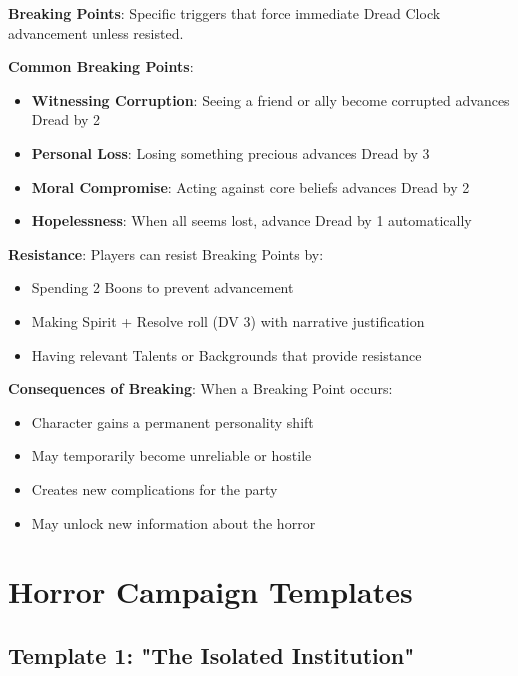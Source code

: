 \documentclass[11pt]{article}
\begin{document}
\begin{mdframed}[backgroundcolor=sanitybg]
\textbf{Breaking Points}: Specific triggers that force immediate Dread Clock advancement unless resisted.

\textbf{Common Breaking Points}:
\begin{itemize}[leftmargin=*]
\item \textbf{Witnessing Corruption}: Seeing a friend or ally become corrupted advances Dread by 2
\item \textbf{Personal Loss}: Losing something precious advances Dread by 3
\item \textbf{Moral Compromise}: Acting against core beliefs advances Dread by 2
\item \textbf{Hopelessness}: When all seems lost, advance Dread by 1 automatically
\end{itemize}

\textbf{Resistance}: Players can resist Breaking Points by:
\begin{itemize}[leftmargin=*]
\item Spending 2 Boons to prevent advancement
\item Making Spirit + Resolve roll (DV 3) with narrative justification
\item Having relevant Talents or Backgrounds that provide resistance
\end{itemize}

\textbf{Consequences of Breaking}: When a Breaking Point occurs:
\begin{itemize}[leftmargin=*]
\item Character gains a permanent personality shift
\item May temporarily become unreliable or hostile
\item Creates new complications for the party
\item May unlock new information about the horror
\end{itemize}
\end{mdframed}

\section*{Horror Campaign Templates}

\subsection*{Template 1: "The Isolated Institution"}
\end{document}
